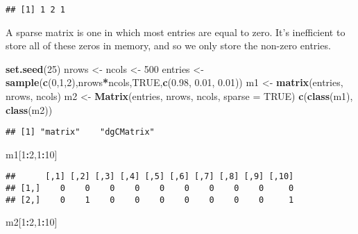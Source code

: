 \documentclass[]{article}
\newenvironment{Shaded}{\begin{snugshade}}{\end{snugshade}}
\newcommand{\DataTypeTok}[1]{\textcolor[rgb]{0.13,0.29,0.53}{#1}}
\newcommand{\DecValTok}[1]{\textcolor[rgb]{0.00,0.00,0.81}{#1}}
\newcommand{\FloatTok}[1]{\textcolor[rgb]{0.00,0.00,0.81}{#1}}
\newcommand{\KeywordTok}[1]{\textcolor[rgb]{0.13,0.29,0.53}{\textbf{#1}}}
\newcommand{\NormalTok}[1]{#1}
\newcommand{\OperatorTok}[1]{\textcolor[rgb]{0.81,0.36,0.00}{\textbf{#1}}}
\newcommand{\OtherTok}[1]{\textcolor[rgb]{0.56,0.35,0.01}{#1}}
\newcommand{\StringTok}[1]{\textcolor[rgb]{0.31,0.60,0.02}{#1}}
\begin{document}
\begin{verbatim}
## [1] 1 2 1
\end{verbatim}

A sparse matrix is one in which most entries are equal to zero. It's
inefficient to store all of these zeros in memory, and so we only store
the non-zero entries.

\begin{Shaded}
\begin{Highlighting}[]
\KeywordTok{set.seed}\NormalTok{(}\DecValTok{25}\NormalTok{)}
\NormalTok{nrows <-}\StringTok{ }\NormalTok{ncols <-}\StringTok{ }\DecValTok{500}
\NormalTok{entries <-}\StringTok{ }\KeywordTok{sample}\NormalTok{(}\KeywordTok{c}\NormalTok{(}\DecValTok{0}\NormalTok{,}\DecValTok{1}\NormalTok{,}\DecValTok{2}\NormalTok{),nrows}\OperatorTok{*}\NormalTok{ncols,}\OtherTok{TRUE}\NormalTok{,}\KeywordTok{c}\NormalTok{(}\FloatTok{0.98}\NormalTok{, }\FloatTok{0.01}\NormalTok{, }\FloatTok{0.01}\NormalTok{))}
\NormalTok{m1 <-}\StringTok{ }\KeywordTok{matrix}\NormalTok{(entries, nrows, ncols)}
\NormalTok{m2 <-}\StringTok{ }\KeywordTok{Matrix}\NormalTok{(entries, nrows, ncols, }\DataTypeTok{sparse =} \OtherTok{TRUE}\NormalTok{)}
\KeywordTok{c}\NormalTok{(}\KeywordTok{class}\NormalTok{(m1), }\KeywordTok{class}\NormalTok{(m2))}
\end{Highlighting}
\end{Shaded}

\begin{verbatim}
## [1] "matrix"    "dgCMatrix"
\end{verbatim}

\begin{Shaded}
\begin{Highlighting}[]
\NormalTok{m1[}\DecValTok{1}\OperatorTok{:}\DecValTok{2}\NormalTok{,}\DecValTok{1}\OperatorTok{:}\DecValTok{10}\NormalTok{]}
\end{Highlighting}
\end{Shaded}

\begin{verbatim}
##      [,1] [,2] [,3] [,4] [,5] [,6] [,7] [,8] [,9] [,10]
## [1,]    0    0    0    0    0    0    0    0    0     0
## [2,]    0    1    0    0    0    0    0    0    0     1
\end{verbatim}

\begin{Shaded}
\begin{Highlighting}[]
\NormalTok{m2[}\DecValTok{1}\OperatorTok{:}\DecValTok{2}\NormalTok{,}\DecValTok{1}\OperatorTok{:}\DecValTok{10}\NormalTok{]}
\end{Highlighting}
\end{Shaded}
\end{document}
